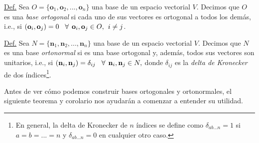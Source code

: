 \documentclass[12pt]{article}
\begin{document}
\begin{tcolorbox}

    \underline{Def.} Sea $O=\{\mathbf{o}_1, \mathbf{o}_2, ..., \mathbf{o}_n\}$ una base de un espacio vectorial $V$. Decimos que $O$ es una \emph{base ortogonal} si cada uno de sus vectores es ortogonal a todos los demás, i.e., si $(\mathbf{o}_i,\mathbf{o}_j)=0\hspace{3mm}\forall\hspace{1.5mm} \mathbf{o}_i, \mathbf{o}_j\in O, \hspace{1.5mm} i\neq j$.

\vspace{3mm}

    \underline{Def.} Sea $N=\{\mathbf{n}_1, \mathbf{n}_2, ..., \mathbf{n}_n\}$ una base de un espacio vectorial $V$. Decimos que $N$ es una base \emph{ortonormal} si es una base ortogonal y, además, todos sus vectores son unitarios, i.e., si $(\mathbf{n}_i,\mathbf{n}_j)=\delta_{ij}\hspace{3mm}\forall\hspace{1.5mm} \mathbf{n}_i,\mathbf{n}_j\in N,$ donde $\delta_{ij}$ es la \emph{delta de Kronecker} de dos índices\footnote{En general, la delta de Kronecker de $n$ índices se define como $\delta_{ab...n}=1$ si $a=b=...=n$ y $\delta_{ab...n}=0$ en cualquier otro caso.}.

\end{tcolorbox}

Antes de ver cómo podemos construir bases ortogonales y ortonormales, el siguiente teorema y corolario nos ayudarán a comenzar a entender su utilidad.
\end{document}

